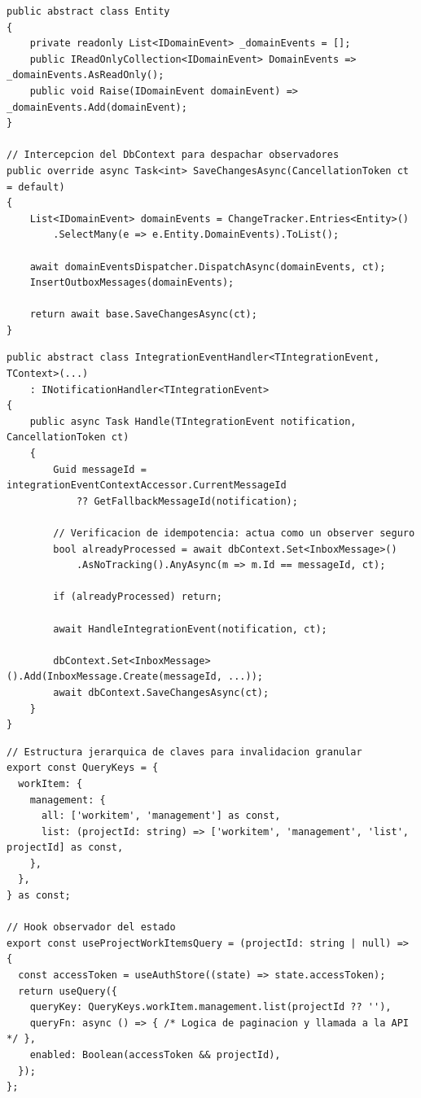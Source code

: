 \begin{lstlisting}[float=htbp, style=CSharp, caption={Implementación del patrón Observer para Eventos de Dominio.}, label={lst:observer_domain}]
public abstract class Entity
{
    private readonly List<IDomainEvent> _domainEvents = [];
    public IReadOnlyCollection<IDomainEvent> DomainEvents => _domainEvents.AsReadOnly();
    public void Raise(IDomainEvent domainEvent) => _domainEvents.Add(domainEvent);
}

// Intercepcion del DbContext para despachar observadores
public override async Task<int> SaveChangesAsync(CancellationToken ct = default)
{
    List<IDomainEvent> domainEvents = ChangeTracker.Entries<Entity>()
        .SelectMany(e => e.Entity.DomainEvents).ToList();

    await domainEventsDispatcher.DispatchAsync(domainEvents, ct);
    InsertOutboxMessages(domainEvents);
    
    return await base.SaveChangesAsync(ct);
}
\end{lstlisting}

\begin{lstlisting}[float=htbp, style=CSharp, caption={Consumo asíncrono e idempotente de Eventos de Integración (Inbox).}, label={lst:observer_integration}]
public abstract class IntegrationEventHandler<TIntegrationEvent, TContext>(...) 
    : INotificationHandler<TIntegrationEvent>
{
    public async Task Handle(TIntegrationEvent notification, CancellationToken ct)
    {
        Guid messageId = integrationEventContextAccessor.CurrentMessageId 
            ?? GetFallbackMessageId(notification);

        // Verificacion de idempotencia: actua como un observer seguro
        bool alreadyProcessed = await dbContext.Set<InboxMessage>()
            .AsNoTracking().AnyAsync(m => m.Id == messageId, ct);
            
        if (alreadyProcessed) return;

        await HandleIntegrationEvent(notification, ct);

        dbContext.Set<InboxMessage>().Add(InboxMessage.Create(messageId, ...));
        await dbContext.SaveChangesAsync(ct);
    }
}
\end{lstlisting}

\begin{lstlisting}[float=htbp, style=TypeScript, caption={Suscripción reactiva al estado del servidor mediante React Query.}, label={lst:observer_frontend}]
// Estructura jerarquica de claves para invalidacion granular
export const QueryKeys = {
  workItem: {
    management: {
      all: ['workitem', 'management'] as const,
      list: (projectId: string) => ['workitem', 'management', 'list', projectId] as const,
    },
  },
} as const;

// Hook observador del estado
export const useProjectWorkItemsQuery = (projectId: string | null) => {
  const accessToken = useAuthStore((state) => state.accessToken);
  return useQuery({
    queryKey: QueryKeys.workItem.management.list(projectId ?? ''),
    queryFn: async () => { /* Logica de paginacion y llamada a la API */ },
    enabled: Boolean(accessToken && projectId),
  });
};
\end{lstlisting}

